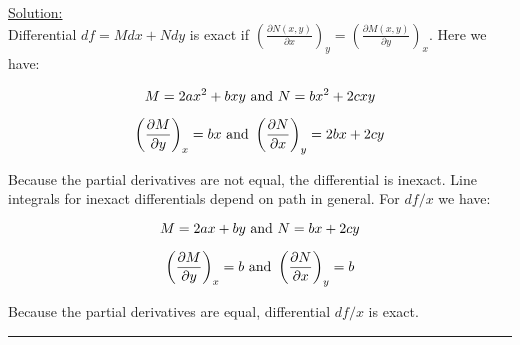 \noindent
\underline{Solution:}\\

Differential $df = Mdx + Ndy$ is exact if $\left(\frac{\partial N(x,y)}{\partial x}\right)_y = \left(\frac{\partial M(x,y)}{\partial y}\right)_x$. Here we have:

$$M = 2ax^2 + bxy\textnormal{ and }N = bx^2 + 2cxy$$

$$\left(\frac{\partial M}{\partial y}\right)_x = bx\textnormal{ and }\left(\frac{\partial N}{\partial x}\right)_y = 2bx + 2cy$$

Because the partial derivatives are not equal, the differential is inexact. Line integrals for inexact differentials depend on path in general. For $df / x$ we have:

$$M = 2ax + by\textnormal{ and }N = bx + 2cy$$

$$\left(\frac{\partial M}{\partial y}\right)_x = b\textnormal{ and }\left(\frac{\partial N}{\partial x}\right)_y = b$$

Because the partial derivatives are equal, differential $df / x$ is exact.

\hrule\vspace{0.5cm}
